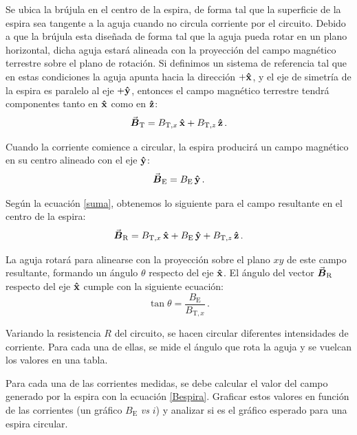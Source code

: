 \documentclass[a4paper,12pt]{article}
\begin{document}
Se ubica la brújula en el centro de la espira, de forma tal que la superficie de la espira sea tangente a la aguja cuando no circula corriente por el circuito. Debido a que la brújula esta diseñada de forma tal que la aguja pueda rotar en un plano horizontal, dicha aguja estará alineada con la proyección del campo magnético terrestre sobre el plano de rotación. Si definimos un sistema de referencia tal que en estas condiciones la aguja apunta hacia la dirección $+\vu{x}$, y el eje de simetría de la espira es paralelo al eje $+\vu{y}$, entonces el campo magnético terrestre tendrá componentes tanto en $\vu{x}$ como en $\vu{z}$:
\begin{equation}\label{inclinacion}
    \va*{B}_\text{T} = B_{\text{T},x}\,\vu{x} + B_{\text{T},z}\,\vu{z}\, .
\end{equation}

Cuando la corriente comience a circular, la espira producirá un campo magnético en su centro alineado con el eje $\vu{y}$:
\begin{equation}
    \va*{B}_\text{E} = B_{\text{E}}\,\vu{y}\, .
\end{equation}

Según la ecuación \ref{suma}, obtenemos lo siguiente para el campo resultante en el centro de la espira:
\begin{equation}
    \va*{B}_\text{R} = B_{\text{T},x}\,\vu{x} + B_{\text{E}}\,\vu{y} + B_{\text{T},z}\,\vu{z}\, .
\end{equation}

La aguja rotará para alinearse con la proyección sobre el plano $xy$ de este campo resultante, formando un ángulo $\theta$ respecto del eje $\vu{x}$. El ángulo del vector $\va*{B}_\text{R}$ respecto del eje $\vu{x}$ cumple con la siguiente ecuación:\\
\begin{equation}\label{theta}
\tan \theta = \frac{B_\text{E}}{B_{\text{T},x}}\, .
\end{equation}

Variando la resistencia $R$ del circuito, se hacen circular diferentes intensidades de corriente. Para cada una de ellas, se mide el ángulo que rota la aguja y se vuelcan los valores en una tabla.\par\medskip

Para cada una de las corrientes medidas, se debe calcular el valor del campo generado por la espira con la ecuación \ref{Bespira}. Graficar estos valores en función de las corrientes (un gráfico $B_\text{E}$ \textit{vs} $i$) y analizar si es el gráfico esperado para una espira circular.\par\medskip
\end{document}
